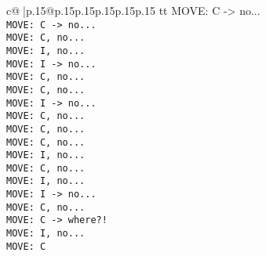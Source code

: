\documentclass{article}
\begin{document}
{\begin{supertabular}{c@{$\;$}|p{.15\linewidth}@{}p{.15\linewidth}p{.15\linewidth}p{.15\linewidth}p{.15\linewidth}p{.15\linewidth}}
{{{tt  MOVE: C -> no...\\ \tt  MOVE: C -> no...\\ \tt  MOVE: C, no...\\ \tt  MOVE: I, no...\\ \tt  MOVE: I -> no...\\ \tt  MOVE: C, no...\\ \tt  MOVE: C, no...\\ \tt  MOVE: I -> no...\\ \tt  MOVE: C, no...\\ \tt  MOVE: C, no...\\ \tt  MOVE: C, no...\\ \tt  MOVE: I, no...\\ \tt  MOVE: C, no...\\ \tt  MOVE: I, no...\\ \tt  MOVE: I -> no...\\ \tt  MOVE: C, no...\\ \tt  MOVE: C -> where?!\\ \tt  MOVE: I, no...\\ \tt  MOVE: C}}}
\end{supertabular}}
\end{document}

